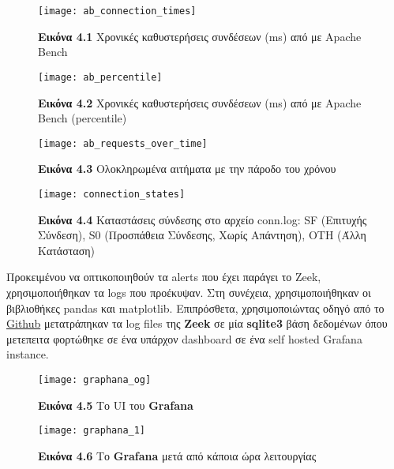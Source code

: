 \begin{figure}[H]
\centering
\texttt{[image: ab\_connection\_times]}
\caption*{\small{\textbf{Εικόνα 4.1} Χρονικές καθυστερήσεις συνδέσεων (ms) από με Apache Bench}}
\end{figure}

\begin{figure}[H]
\centering
\texttt{[image: ab\_percentile]}
\caption*{\small{\textbf{Εικόνα 4.2} Χρονικές καθυστερήσεις συνδέσεων (ms) από με Apache Bench (percentile)}}
\end{figure}

\begin{figure}[H]
\centering
\texttt{[image: ab\_requests\_over\_time]}
\caption*{\small{\textbf{Εικόνα 4.3} Ολοκληρωμένα αιτήματα με την πάροδο του χρόνου}}
\end{figure}

\begin{figure}[H]
\centering
\texttt{[image: connection\_states]}
\caption*{\small{\textbf{Εικόνα 4.4} Καταστάσεις σύνδεσης στο αρχείο conn.log: SF (Επιτυχής Σύνδεση), S0 (Προσπάθεια Σύνδεσης, Χωρίς Απάντηση), OTH (Άλλη Κατάσταση)}}
\end{figure}

Προκειμένου να οπτικοποιηθούν τα alerts που έχει παράγει το Zeek, χρησιμοποιήθηκαν τα logs που προέκυψαν. Στη συνέχεια, χρησιμοποιήθηκαν οι βιβλιοθήκες pandas και matplotlib. Επιπρόσθετα, χρησιμοποιώντας οδηγό από το \href{https://github.com/hackertarget/pcap-did-what/blob/master/zeek-docker/zeek-to-sqlite.py}{Github} μετατράπηκαν τα log files της \textbf{Zeek} σε μία \textbf{sqlite3} βάση δεδομένων όπου μετεπειτα φορτώθηκε σε ένα υπάρχον dashboard σε ένα self hosted Grafana instance.

\begin{figure}[H]
\centering
\texttt{[image: graphana\_og]}
\caption*{\small{\textbf{Εικόνα 4.5} Το UI του \textbf{Grafana}}}
\end{figure}

\begin{figure}[H]
\centering
\texttt{[image: graphana\_1]}
\caption*{\small{\textbf{Εικόνα 4.6} Το \textbf{Grafana} μετά από κάποια ώρα λειτουργίας }}
\end{figure}